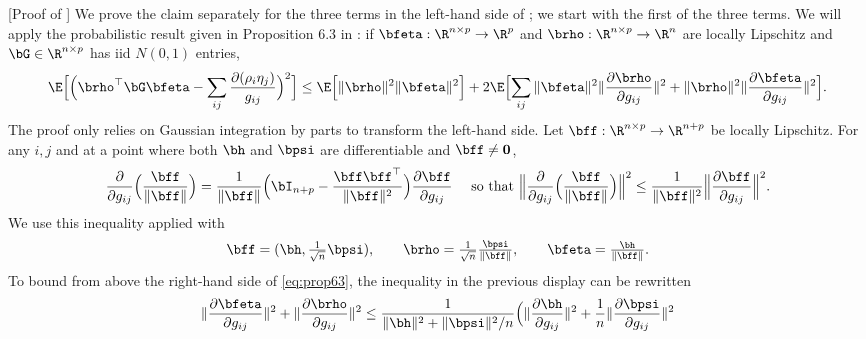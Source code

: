 \documentclass{colt2022} %
\renewenvironment{proof}[1][]
{
    \begin{newproof}
    \ifthenelse{\equal{#1}{}}{ }{\textbf{(#1) }}%
}{
    \end{newproof}
}
\numberwithin{equation}{section}
\begin{document}
\propSteinThree*
\begin{proof} [Proof of ]
    We prove the claim separately for the three terms in the left-hand side
    of ; we start with the first of the three terms.
    We will apply the probabilistic result given in
    Proposition 6.3 in \cite{bellec2020out_of_sample}:
    if $\bfeta:\R^{n\times p}\to\R^p$ and $\brho:\R^{n\times p}\to\R^n$
    are locally Lipschitz and $\bG\in\R^{n\times p}$ has iid $N(0,1)$
    entries,
    \begin{equation}
    \E\Bigl[\Bigl(\brho^\top\bG\bfeta - \sum_{ij} \frac{\partial (\rho_i\eta_j)}{g_{ij}}\Bigr)^2\Bigr]
    \le
    \E\Bigl[\|\brho\|^2 \|\bfeta\|^2\Bigr]
    +
    2\E\Bigl[\sum_{ij}
    \|\bfeta\|^2 \| \frac{\partial \brho}{\partial g_{ij}}\|^2
    +
    \|\brho\|^2 \| \frac{\partial \bfeta}{\partial g_{ij}}\|^2
    \Bigr].
    \label{eq:prop63}
    \end{equation}
    The proof only relies on Gaussian integration by parts
    to transform the left-hand side.
    Let $\bff:\R^{n\times p}\to \R^{n+p}$ be locally Lipschitz. For any $i,j$
    and at a point where both $\bh$ and $\bpsi$ are differentiable
    and $\bff\ne \mathbf0$,
    \begin{equation*}
    \frac{\partial}{\partial g_{ij}}
    \Bigl(\frac{\bff}{\|\bff\|}\Bigr)
    =
    \frac{1}{\|\bff\|}
    \Bigl(\bI_{n+p} - \frac{\bff\bff^\top}{\|\bff\|^2}\Bigr)
    \frac{\partial \bff}{\partial g_{ij}}
    \quad
    \text{ so that }
    \Big\|
    \frac{\partial}{\partial g_{ij}}
    \Bigl(\frac{\bff}{\|\bff\|}\Bigr)
    \Big\|^2
    \le \frac{1}{\|\bff\|^2}
    \Big\|
    \frac{\partial \bff}{\partial g_{ij}}
    \Big\|^2.
    \end{equation*}
    We use this inequality applied with
    \begin{equation}
        \label{bff-brho-bh}
    \bff=(\bh,\tfrac{1}{ \sqrt{n} } \bpsi),\qquad
    \brho = \tfrac{1}{\sqrt n} \tfrac{\bpsi}{\|\bff\|},\qquad
    \bfeta = \tfrac{\bh }{\|\bff\|}.
    \end{equation}
    To bound from above 
    the right-hand side of \eqref{eq:prop63},
    the inequality
    in the previous display can be rewritten
    \begin{equation}
    \|
    \frac{\partial \bfeta}{\partial g_{ij}}
    \|^2
    +
    \|
    \frac{\partial \brho}{\partial g_{ij}}
    \|^2
    \le
    \frac{1}{\|\bh\|^2 + \|\bpsi\|^2/n}
    \Bigl(
    \|\frac{\partial \bh}{\partial g_{ij}}\|^2
    +
    \frac 1 n \|\frac{\partial \bpsi}{\partial g_{ij}}\|^2

\end{equation}
\end{proof}
\end{document}
